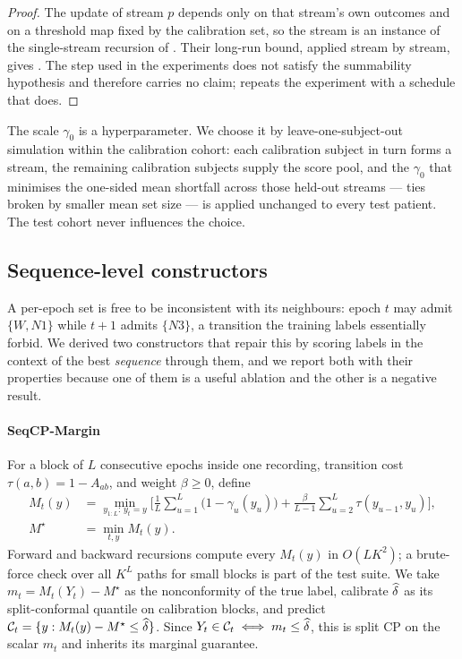 \begin{proof}
The update  of stream $p$ depends only on that stream's
own outcomes and on a threshold map fixed by the calibration set, so the
stream is an instance of the single-stream recursion of
\citet{angelopoulos2024}. Their long-run bound, applied stream by stream,
gives . The step  used in the
experiments does not satisfy the summability hypothesis and therefore carries
no claim;  repeats the experiment with a schedule that
does.
\end{proof}

The scale $\gamma_0$ is a hyperparameter. We choose it by leave-one-subject-out
simulation within the calibration cohort: each calibration subject in turn
forms a stream, the remaining calibration subjects supply the score pool, and
the $\gamma_0$ that minimises the one-sided mean shortfall
 across those held-out streams --- ties broken by smaller
mean set size --- is applied unchanged to every test patient. The test cohort
never influences the choice.

\subsection{Sequence-level constructors}
\label{sec:method-seq}

A per-epoch set is free to be inconsistent with its neighbours: epoch $t$ may
admit $\{W,N1\}$ while $t+1$ admits $\{N3\}$, a transition the training labels
essentially forbid. We derived two constructors that repair this by scoring
labels in the context of the best \emph{sequence} through them, and we report
both with their properties because one of them is a useful ablation and the
other is a negative result.

\paragraph{SeqCP-Margin}
For a block of $L$ consecutive epochs inside one recording, transition cost
$\tau(a,b)=1-A_{ab}$, and weight $\beta\ge0$, define
\begin{equation}
\begin{aligned}
M_t(y)&=\min_{y_{1:L}:\,y_t=y}
\Big[\frac1L\sum_{u=1}^{L}\big(1-\gamma_u(y_u)\big)
+\frac{\beta}{L-1}\sum_{u=2}^{L}\tau(y_{u-1},y_u)\Big],\\
M^\star&=\min_{t,y}M_t(y).
\end{aligned}
\label{eq:margin}
\end{equation}
Forward and backward recursions compute every $M_t(y)$ in $O(LK^2)$; a
brute-force check over all $K^L$ paths for small blocks is part of the test
suite. We take $m_t=M_t(Y_t)-M^\star$ as the nonconformity of the true label,
calibrate $\widehat{\delta}$ as its split-conformal quantile on calibration blocks,
and predict $\mathcal{C}_t=\{y:M_t(y)-M^\star\le\widehat{\delta}\}$. Since
$Y_t\in\mathcal{C}_t\iff m_t\le\widehat{\delta}$, this is split CP on the scalar $m_t$ and
inherits its marginal guarantee.

